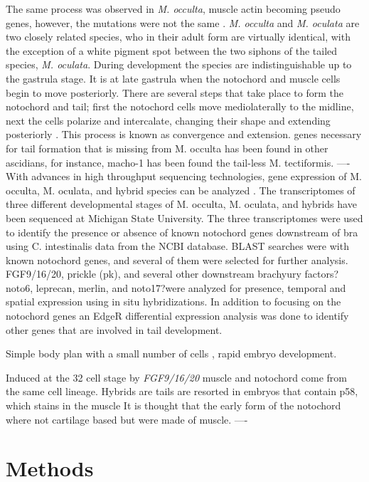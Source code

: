 The same process was observed in \textit{M. occulta}, muscle actin becoming pseudo genes, however, the mutations were not the same \cite{swalla_novel_1993}. \textit{M. occulta} and \textit{M. oculata} are two closely related species, who in their adult form are virtually identical, with the exception of a white pigment spot between the two siphons of the tailed species, \textit{M. oculata}. During development the species are indistinguishable up to the gastrula stage. It is at late gastrula when the notochord and muscle cells begin to move posteriorly. There are several steps that take place to form the notochord and tail; first the notochord cells move mediolaterally to the midline, next the cells polarize and intercalate, changing their shape and extending posteriorly \cite{keller_mechanisms_2000, jiang_ascidian_2005,stemple_structure_2005}. This process is known as convergence and extension. 
genes necessary for tail formation that is missing from M. occulta has been found in other ascidians, for instance, macho-1 has been found the tail-less M. tectiformis. 
----
With advances in high throughput sequencing technologies, gene expression of M. occulta, M. oculata, and hybrid species can be analyzed \cite{gyoja_analysis_2007,pickrell_variation_2010}. The transcriptomes of three different developmental stages of M. occulta, M. oculata, and hybrids have been sequenced at Michigan State University. The three transcriptomes were used to identify the presence or absence of known notochord genes downstream of bra using C. intestinalis data from the NCBI database. BLAST searches were with known notochord genes, and several of them were selected for further analysis. FGF9/16/20, prickle (pk), and several other downstream brachyury factors?noto6, leprecan, merlin, and noto17?were analyzed for presence, temporal and spatial expression using in situ hybridizations. In addition to focusing on the notochord genes an EdgeR differential expression analysis was done to identify other genes that are involved in tail development.

Simple body plan with a small number of cells \cite{satoh_ascidian_2001,satoh_genome_2002}, rapid embryo development.

Induced at the 32 cell stage by \textit{FGF9/16/20}
muscle and notochord come from the same cell lineage.
Hybrids are tails are resorted in embryos that contain p58, which stains in the muscle 
It is thought that the early form of the notochord where not cartilage based but were made of muscle.   
----
\section{Methods}
